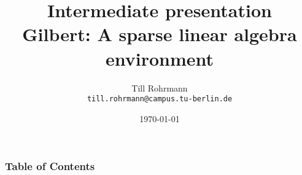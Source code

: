 
\usepackage[utf8]{inputenc}
\usepackage[T1]{fontenc}
\usepackage{lmodern}

\usepackage{graphicx}
\usepackage{float}
\usepackage{caption}
\captionsetup{labelformat=empty,labelsep=none}

\usepackage{color}
\newcommand{\hilight}[1]{\colorbox{yellow}{#1}}

\newcommand{\norm}[1]{\lVert#1\rVert}

\title{Intermediate presentation\\
Gilbert: A sparse linear algebra environment}
\author[T. Rohrmann]{Till Rohrmann\\
\texttt{till.rohrmann@campus.tu-berlin.de}}
\date{\today}
\subject{Gilbert: A sparse linear algebra environment}


		\frame{\titlepage}
		\begin{frame}
			\frametitle{Table of Contents}
			\tableofcontents
		\end{frame}
		
		
		
				
		
		

